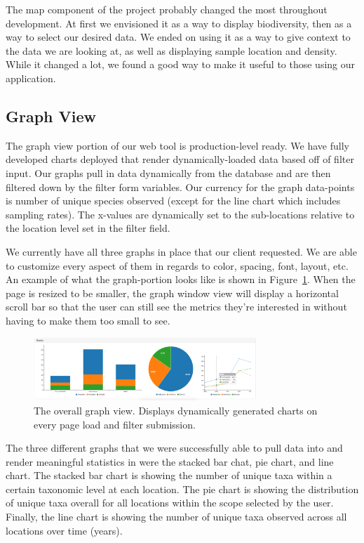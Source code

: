 \documentclass[10pt,draftclsnofoot,onecolumn]{IEEEtran}
\begin{document}
The map component of the project probably changed the most throughout development.
At first we envisioned it as a way to display biodiversity, then as a way to select our desired data.
We ended on using it as a way to give context to the data we are looking at, as well as displaying sample location and density.
While it changed a lot, we found a good way to make it useful to those using our application.

\subsection{Graph View} %
The graph view portion of our web tool is production-level ready.
We have fully developed charts deployed that render dynamically-loaded data based off of filter input.
Our graphs pull in data dynamically from the database and are then filtered down by the filter form variables.
Our currency for the graph data-points is number of unique species observed (except for the line chart which includes sampling rates).
The x-values are dynamically set to the sub-locations relative to the location level set in the filter field.

We currently have all three graphs in place that our client requested.
We are able to customize every aspect of them in regards to color, spacing, font, layout, etc.
An example of what the graph-portion looks like is shown in Figure~\ref{fig:graph_view}.
When the page is resized to be smaller, the graph window view will display a horizontal scroll bar so that the user can still see the metrics they’re interested in without having to make them too small to see.

\begin{figure}[h]
\centering
\includegraphics[width=0.75\textwidth]{images/graph_view.png}
\captionsetup{justification=centering}
\caption{
  The overall graph view.
  Displays dynamically generated charts on every page load and filter submission.
}
\label{fig:graph_view}
\end{figure}

The three different graphs that we were successfully able to pull data into and render meaningful statistics in were the stacked bar chat, pie chart, and line chart.
The stacked bar chart is showing the number of unique taxa within a certain taxonomic level at each location.
The pie chart is showing the distribution of unique taxa overall for all locations within the scope selected by the user.
Finally, the line chart is showing the number of unique taxa observed across all locations over time (years).
\end{document}
